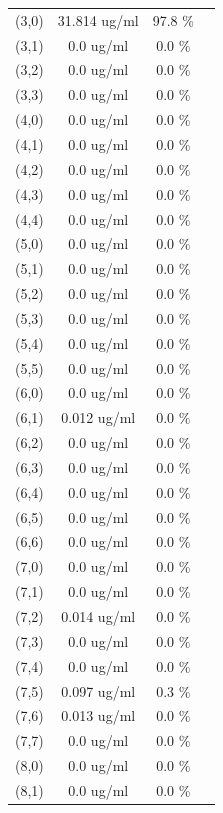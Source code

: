 \documentclass{article}
\begin{document}
\begin{tabular}{c c c c}
(3,0)&        31.814 ug/ml        &97.8 \%\\
(3,1)&        0.0 ug/ml        &0.0 \%\\
(3,2)&        0.0 ug/ml        &0.0 \%\\
(3,3)&        0.0 ug/ml        &0.0 \%\\
(4,0)&        0.0 ug/ml        &0.0 \%\\
(4,1)&        0.0 ug/ml        &0.0 \%\\
(4,2)&        0.0 ug/ml        &0.0 \%\\
(4,3)&        0.0 ug/ml        &0.0 \%\\
(4,4)&        0.0 ug/ml        &0.0 \%\\
(5,0)&        0.0 ug/ml        &0.0 \%\\
(5,1)&        0.0 ug/ml        &0.0 \%\\
(5,2)&        0.0 ug/ml        &0.0 \%\\
(5,3)&        0.0 ug/ml        &0.0 \%\\
(5,4)&        0.0 ug/ml        &0.0 \%\\
(5,5)&        0.0 ug/ml        &0.0 \%\\
(6,0)&        0.0 ug/ml        &0.0 \%\\
(6,1)&        0.012 ug/ml        &0.0 \%\\
(6,2)&        0.0 ug/ml        &0.0 \%\\
(6,3)&        0.0 ug/ml        &0.0 \%\\
(6,4)&        0.0 ug/ml        &0.0 \%\\
(6,5)&        0.0 ug/ml        &0.0 \%\\
(6,6)&        0.0 ug/ml        &0.0 \%\\
(7,0)&        0.0 ug/ml        &0.0 \%\\
(7,1)&        0.0 ug/ml        &0.0 \%\\
(7,2)&        0.014 ug/ml        &0.0 \%\\
(7,3)&        0.0 ug/ml        &0.0 \%\\
(7,4)&        0.0 ug/ml        &0.0 \%\\
(7,5)&        0.097 ug/ml        &0.3 \%\\
(7,6)&        0.013 ug/ml        &0.0 \%\\
(7,7)&        0.0 ug/ml        &0.0 \%\\
(8,0)&        0.0 ug/ml        &0.0 \%\\
(8,1)&        0.0 ug/ml        &0.0 \%\\

\end{tabular}
\end{document}
